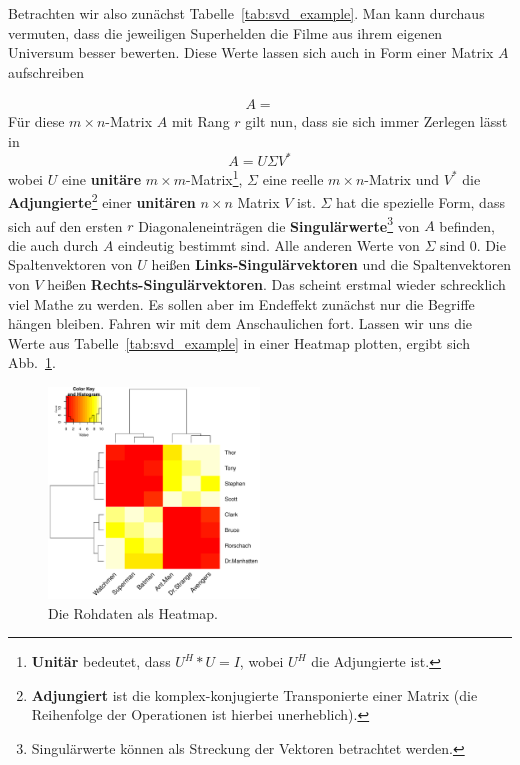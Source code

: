 

Betrachten wir also zunächst Tabelle~\ref{tab:svd_example}. Man kann durchaus vermuten,
dass die jeweiligen Superhelden die Filme aus ihrem eigenen Universum besser bewerten.
Diese Werte lassen sich auch in Form einer Matrix \(A\) aufschreiben

\begin{align*}
	A = 
\end{align*}
Für diese \(m\times n\)-Matrix \(A\) mit Rang \(r\) gilt nun, dass sie sich immer 
Zerlegen lässt in
\[
	A = U\Sigma V^*
\]
wobei \(U\) eine \textbf{unitäre} \(m\times m\)-Matrix\footnote{\textbf{Unitär} bedeutet,
dass \(U^{H}*U = I\), wobei \(U^{H}\) die Adjungierte ist.}, \(\Sigma\) eine 
reelle \(m\times n\)-Matrix und \(V^*\) die \textbf{Adjungierte}\footnote{\textbf{Adjungiert}
ist die komplex-konjugierte Transponierte einer Matrix (die Reihenfolge der
Operationen ist hierbei unerheblich).} einer
\textbf{unitären} \(n\times n\) Matrix \(V\) ist. \(\Sigma\) hat die spezielle Form, dass
sich auf den ersten \(r\) Diagonaleneinträgen die \textbf{Singulärwerte}\footnote{Singulärwerte
können als Streckung der Vektoren betrachtet werden.} von \(A\)
befinden, die auch durch \(A\) eindeutig bestimmt sind. Alle anderen Werte von
\(\Sigma\) sind \(0\). Die Spaltenvektoren von \(U\) heißen \textbf{Links-Singulärvektoren}
und die Spaltenvektoren von \(V\) heißen \textbf{Rechts-Singulärvektoren}.
Das scheint erstmal wieder schrecklich viel Mathe zu werden. Es sollen aber im
Endeffekt zunächst nur die Begriffe hängen bleiben. Fahren wir mit dem Anschaulichen
fort. Lassen wir uns die Werte aus Tabelle~\ref{tab:svd_example} in einer Heatmap
plotten, ergibt sich Abb.~\ref{fig:original_data}.

\begin{figure}[!th]
	\center
	\includegraphics[width=0.5\textwidth]{Figures/original_data}
	\caption{Die Rohdaten als Heatmap.}
	\label{fig:original_data}
\end{figure}

